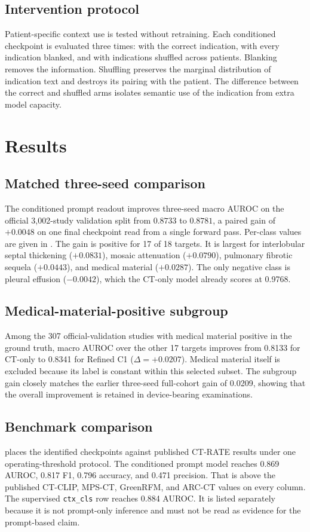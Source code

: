 \documentclass[10pt,twocolumn]{article}
\begin{document}
\subsection{Intervention protocol}
Patient-specific context use is tested without retraining. Each conditioned
checkpoint is evaluated three times: with the correct indication, with every
indication blanked, and with indications shuffled across patients. Blanking
removes the information. Shuffling preserves the marginal distribution of
indication text and destroys its pairing with the patient. The difference
between the correct and shuffled arms isolates semantic use of the indication
from extra model capacity.

\section{Results}
\subsection{Matched three-seed comparison}
The conditioned prompt readout improves three-seed macro AUROC on the official
3,002-study validation split from $0.8733$ to $0.8781$, a paired gain of
$+0.0048$ on one final checkpoint read from a single forward pass.
Per-class values are given in . The gain is positive for
17 of 18 targets. It is largest for interlobular septal thickening
($+0.0831$), mosaic attenuation ($+0.0790$), pulmonary fibrotic sequela
($+0.0443$), and medical material ($+0.0287$). The only negative class is
pleural effusion ($-0.0042$), which the CT-only model already scores at
0.9768.

\subsection{Medical-material-positive subgroup}
Among the 307 official-validation studies with medical material positive in
the ground truth, macro AUROC over the other 17 targets improves from 0.8133
for CT-only to 0.8341 for Refined C1 ($\Delta=+0.0207$). Medical material
itself is excluded because its label is constant within this selected subset.
The subgroup gain closely matches the earlier three-seed full-cohort gain of
0.0209, showing that
the overall improvement is retained in device-bearing examinations.

\subsection{Benchmark comparison}
 places the identified checkpoints against published CT-RATE
results under one operating-threshold protocol. The conditioned prompt model
reaches 0.869 AUROC, 0.817 F1, 0.796 accuracy, and 0.471 precision. That is
above the published CT-CLIP, MPS-CT, GreenRFM, and ARC-CT values on every
column. The supervised \texttt{ctx\_cls} row reaches 0.884 AUROC. It is listed
separately because it is not prompt-only inference and must not be read as
evidence for the prompt-based claim.
\end{document}
